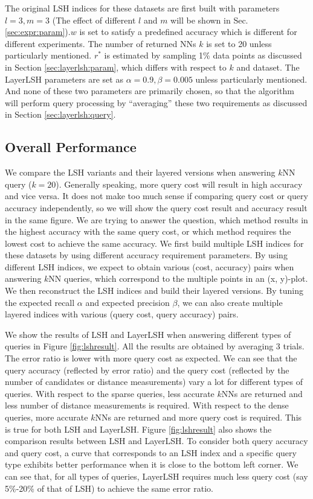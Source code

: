  The original LSH indices for these datasets are first built with parameters $l=3,m=3$ (The effect of different $l$ and $m$ will be shown in Sec. \ref{sec:expr:param}).$w$ is set to satisfy a predefined accuracy which is different for different experiments. The number of returned NNs $k$ is set to 20 unless particularly mentioned. $r^*$ is estimated by sampling 1\% data points as discussed in Section \ref{sec:layerlsh:param}, which differs with respect to $k$ and dataset. The LayerLSH parameters are set as $\alpha=0.9, \beta=0.005$ unless particularly mentioned. And none of these two parameters are primarily chosen, so that the algorithm will perform query processing by ``averaging'' these two requirements as discussed in Section \ref{sec:layerlsh:query}.

\subsection{Overall Performance}
\label{sec:expr:overall}

We compare the LSH variants and their layered versions when answering $k$NN query ($k=20$). Generally speaking, more query cost will result in high accuracy and vice versa. It does not make too much sense if comparing query cost or query accuracy independently, so we will show the query cost result and accuracy result in the same figure. We are trying to answer the question, which method results in the highest accuracy with the same query cost, or which method requires the lowest cost to achieve the same accuracy. We first build multiple LSH indices for these datasets by using different accuracy requirement parameters. By using different LSH indices, we expect to obtain various (cost, accuracy) pairs when answering $k$NN queries, which correspond to the multiple points in an (x, y)-plot. We then reconstruct the LSH indices and build their layered versions. By tuning the expected recall $\alpha$ and expected precision $\beta$, we can also create multiple layered indices with various (query cost, query accuracy) pairs.

 We show the results of LSH and LayerLSH when answering different types of queries in Figure \ref{fig:lshresult}. All the results are obtained by averaging 3 trials. The error ratio is lower with more query cost as expected. We can see that the query accuracy (reflected by error ratio) and the query cost (reflected by the number of candidates or distance measurements) vary a lot for different types of queries. With respect to the sparse queries, less accurate $k$NNs are returned and less number of distance measurements is required. With respect to the dense queries, more accurate $k$NNs are returned and more query cost is required. This is true for both LSH and LayerLSH. Figure \ref{fig:lshresult} also shows the comparison results between LSH and LayerLSH. To consider both query accuracy and query cost, a curve that corresponds to an LSH index and a specific query type exhibits better performance when it is close to the bottom left corner. We can see that, for all types of queries, LayerLSH requires much less query cost (say 5\%-20\% of that of LSH) to achieve the same error ratio.

